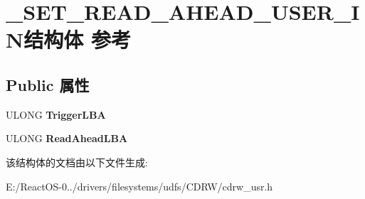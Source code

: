 \hypertarget{struct___s_e_t___r_e_a_d___a_h_e_a_d___u_s_e_r___i_n}{}\section{\+\_\+\+S\+E\+T\+\_\+\+R\+E\+A\+D\+\_\+\+A\+H\+E\+A\+D\+\_\+\+U\+S\+E\+R\+\_\+\+I\+N结构体 参考}
\label{struct___s_e_t___r_e_a_d___a_h_e_a_d___u_s_e_r___i_n}
\subsection*{Public 属性}
\begin{DoxyCompactItemize}
\item 
\mbox{\label{struct___s_e_t___r_e_a_d___a_h_e_a_d___u_s_e_r___i_n_a21b3a19824ead2e16ce206094fb5ed42}} 
U\+L\+O\+NG {\bfseries Trigger\+L\+BA}
\item 
\mbox{\label{struct___s_e_t___r_e_a_d___a_h_e_a_d___u_s_e_r___i_n_ac911fef94287aa66a533afc189be3b24}} 
U\+L\+O\+NG {\bfseries Read\+Ahead\+L\+BA}
\end{DoxyCompactItemize}


该结构体的文档由以下文件生成\+:\begin{DoxyCompactItemize}
\item 
E\+:/\+React\+O\+S-\/0../drivers/filesystems/udfs/\+C\+D\+R\+W/cdrw\+\_\+usr.\+h\end{DoxyCompactItemize}
